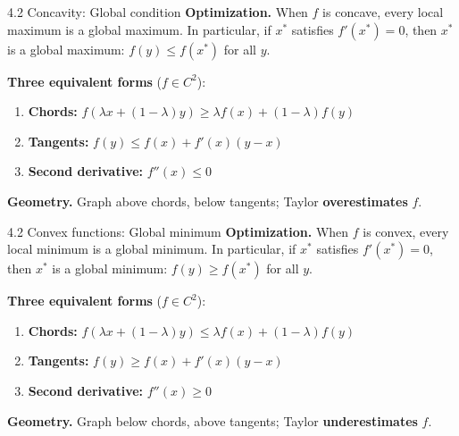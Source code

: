 \documentclass[11pt,aspectratio=169]{beamer}
\begin{document}
\begin{frame}{4.2 Concavity: Global condition}
  \small
  \textbf{Optimization.} When $f$ is concave, every local maximum is a global maximum. In particular, if $x^*$ satisfies $f'(x^*)=0$, then $x^*$ is a global maximum: $f(y) \leq f(x^*)$ for all $y$.
  
  \textbf{Three equivalent forms} ($f \in C^2$):
  \begin{enumerate}
    \item \textbf{Chords:} $f(\lambda x + (1-\lambda)y) \geq \lambda f(x) + (1-\lambda)f(y)$
    
    \item \textbf{Tangents:} $f(y) \leq f(x) + f'(x)(y-x)$
    
    \item \textbf{Second derivative:} $f''(x) \leq 0$
  \end{enumerate}
  
  \textbf{Geometry.} Graph above chords, below tangents; Taylor \textbf{overestimates} $f$.
\end{frame}

\begin{frame}{4.2 Convex functions: Global minimum}
  \small
  \textbf{Optimization.} When $f$ is convex, every local minimum is a global minimum. In particular, if $x^*$ satisfies $f'(x^*)=0$, then $x^*$ is a global minimum: $f(y) \geq f(x^*)$ for all $y$.
  
  \textbf{Three equivalent forms} ($f \in C^2$):
  \begin{enumerate}
    \item \textbf{Chords:} $f(\lambda x + (1-\lambda)y) \leq \lambda f(x) + (1-\lambda)f(y)$
    
    \item \textbf{Tangents:} $f(y) \geq f(x) + f'(x)(y-x)$
    
    \item \textbf{Second derivative:} $f''(x) \geq 0$
  \end{enumerate}
  
  \textbf{Geometry.} Graph below chords, above tangents; Taylor \textbf{underestimates} $f$.
\end{frame}
\end{document}
